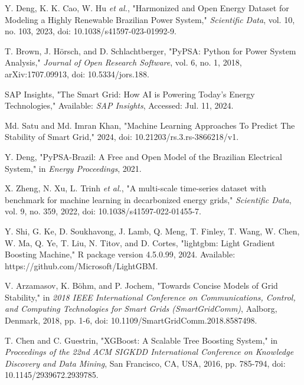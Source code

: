 \documentclass[journal]{IEEEtran}
\begin{document}
\begin{thebibliography}{1}
    Y. Deng, K. K. Cao, W. Hu \textit{et al.}, "Harmonized and Open Energy Dataset for Modeling a Highly Renewable Brazilian Power System," \textit{Scientific Data}, vol. 10, no. 103, 2023, doi: 10.1038/s41597-023-01992-9.

    T. Brown, J. Hörsch, and D. Schlachtberger, "PyPSA: Python for Power System Analysis," \textit{Journal of Open Research Software}, vol. 6, no. 1, 2018, arXiv:1707.09913, doi: 10.5334/jors.188.

    SAP Insights, "The Smart Grid: How AI is Powering Today’s Energy Technologies," Available: \textit{SAP Insights}, Accessed: Jul. 11, 2024.

    Md. Satu and Md. Imran Khan, "Machine Learning Approaches To Predict The Stability of Smart Grid," 2024, doi: 10.21203/rs.3.rs-3866218/v1.

    Y. Deng, "PyPSA-Brazil: A Free and Open Model of the Brazilian Electrical System," in \textit{Energy Proceedings}, 2021.

    X. Zheng, N. Xu, L. Trinh \textit{et al.}, "A multi-scale time-series dataset with benchmark for machine learning in decarbonized energy grids," \textit{Scientific Data}, vol. 9, no. 359, 2022, doi: 10.1038/s41597-022-01455-7.

    Y. Shi, G. Ke, D. Soukhavong, J. Lamb, Q. Meng, T. Finley, T. Wang, W. Chen, W. Ma, Q. Ye, T. Liu, N. Titov, and D. Cortes, "lightgbm: Light Gradient Boosting Machine," R package version 4.5.0.99, 2024. Available: https://github.com/Microsoft/LightGBM.

    V. Arzamasov, K. Böhm, and P. Jochem, "Towards Concise Models of Grid Stability," in \textit{2018 IEEE International Conference on Communications, Control, and Computing Technologies for Smart Grids (SmartGridComm)}, Aalborg, Denmark, 2018, pp. 1-6, doi: 10.1109/SmartGridComm.2018.8587498.

    T. Chen and C. Guestrin, "XGBoost: A Scalable Tree Boosting System," in \textit{Proceedings of the 22nd ACM SIGKDD International Conference on Knowledge Discovery and Data Mining}, San Francisco, CA, USA, 2016, pp. 785-794, doi: 10.1145/2939672.2939785.

\end{thebibliography}
\end{document}
